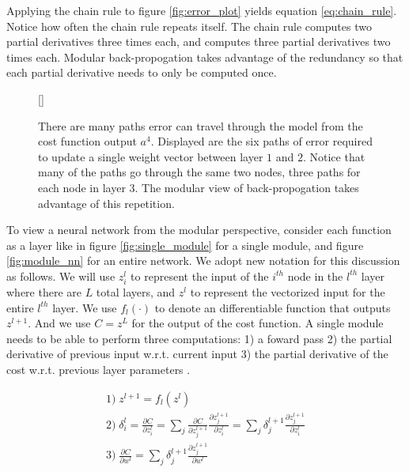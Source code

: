 \documentclass[11pt]{article}
\begin{document}
Applying the chain rule to figure \ref{fig:error_plot} yields equation \ref{eq:chain_rule}. Notice how often the chain rule repeats itself. The chain rule computes two partial derivatives three times each, and computes three partial derivatives two times each. Modular back-propogation takes advantage of the redundancy so that each partial derivative needs to only be computed once.

\begin{figure}[H]
  [\FBwidth]
  {\caption{There are many paths error can travel through the model from the cost function output $a^{4}$. Displayed are the six paths of error required to update a single weight vector between layer $1$ and $2$. Notice that many of the paths go through the same two nodes, three paths for each node in layer $3$. The modular view of back-propogation takes advantage of this repetition.}\label{fig:error_paths}}{}
\end{figure}

\par
To view a neural network from the modular perspective, consider each function as a layer like in figure \ref{fig:single_module} for a single module, and figure \ref{fig:module_nn} for an entire network. We adopt new notation for this discussion as follows. We will use $z_{i}^{l}$ to represent the input of the $i^{th}$ node in the $l^{th}$ layer where there are $L$ total layers, and $z^{l}$ to represent the vectorized input for the entire $l^{th}$ layer. We use $f_{l}(\cdotp)$ to denote an differentiable function that outputs $z^{l+1}$. And we use $C = z^{L}$ for the output of the cost function. A single module needs to be able to perform three computations: 1) a foward pass 2) the partial derivative of previous input w.r.t. current input 3) the partial derivative of the cost w.r.t. previous layer parameters \cite{Freitas}.

\begin{gather}
  1) \; z^{l+1}=f_{l}(z^{l})\label{eq:mod_1} \\
  2) \; \delta_{i}^{l} = \frac{\partial C}{\partial z_{i}^{l}} = \sum_{j} \frac{\partial C}{\partial z_{j}^{l+1}} \frac{\partial z_{j}^{l+1}}{\partial z_{i}^{l}} = \sum_{j}\delta_{j}^{l+1}\frac{\partial z_{j}^{l+1}}{\partial z_{i}^{l}}\label{eq:mod_2}\\
  3) \; \frac{\partial C}{\partial w^{l}} = \sum_{j} \delta_{j}^{l+1}\frac{\partial z_{j}^{l+1}}{\partial w^{l}}\label{eq:mod_3}
\end{gather}
\end{document}
